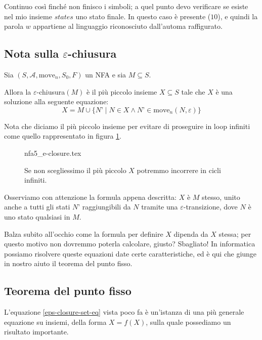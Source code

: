 \documentclass[class=book, crop=false, oneside, 12pt]{standalone}
\begin{document}
Continuo così finché non finisco i simboli; a quel punto devo verificare se esiste nel mio insieme \(states\) uno stato finale. In questo caso è presente (\(10\)), e quindi la parola \(w\) appartiene al linguaggio riconosciuto dall’automa raffigurato.


\subsection{Nota sulla \(\varepsilon\)-chiusura}
\begin{theorem}
    Sia \((S, \mathcal{A}, \textrm{move}_n, S_0, F)\) un NFA e sia \(M \subseteq S\).
    
    Allora la \(\varepsilon\)-chiusura\((M)\) è il più piccolo insieme \(X \subseteq S\) tale che \(X\) è una soluzione alla seguente equazione:
    \begin{equation}
        X = M \cup \{ N’ \mid N \in X \land N’ \in \textrm{move}_n (N,\varepsilon)\}
        \label{eps-closure-set-eq}
    \end{equation}
\end{theorem}

\noindent Nota che diciamo il più piccolo insieme per evitare di proseguire in loop infiniti come quello rappresentato in figura \ref{nfa_ciclico}.

\begin{figure}
    \centering
    {nfa5_e-closure.tex}
    \caption{Se non scegliessimo il più piccolo \(X\) potremmo incorrere in cicli infiniti.}
    \label{nfa_ciclico}
\end{figure}

Osserviamo con attenzione la formula appena descritta: \(X\) è \(M\) stesso, unito anche a tutti gli stati \(N’\) raggiungibili da \(N\) tramite una \(\varepsilon\)-transizione, dove \(N\) è uno stato qualsiasi in \(M\).

Balza subito all'occhio come la formula per definire \(X\) dipenda da \(X\) stessa; per questo motivo non dovremmo poterla calcolare, giusto? 
Sbagliato! In informatica possiamo risolvere queste equazioni date certe caratteristiche, ed è qui che giunge in nostro aiuto il teorema del punto fisso. 


\subsection{Teorema del punto fisso}
L'equazione \ref{eps-closure-set-eq} vista poco fa è un'istanza di una più generale equazione su insiemi, della forma \(X = f(X)\), sulla quale possediamo un risultato importante.
\end{document}
